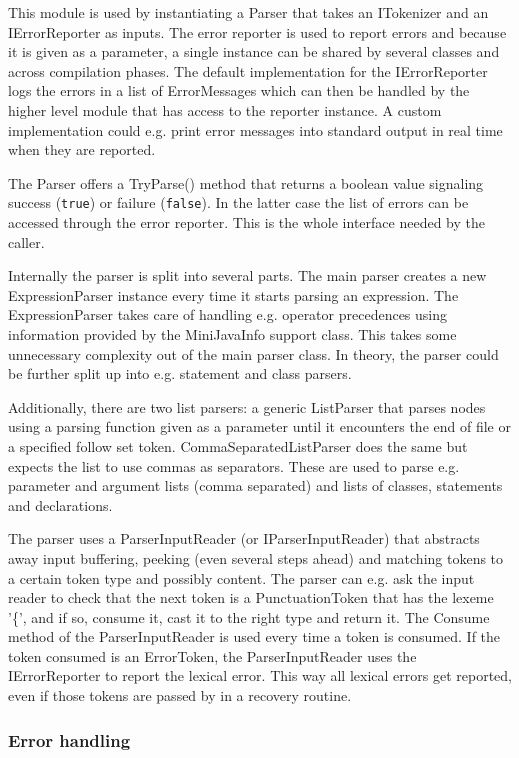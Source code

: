 \documentclass[a4paper,11pt]{article}
\begin{document}
This module is used by instantiating a Parser that takes an ITokenizer and an IErrorReporter as inputs. The error reporter is used to report errors and because it is given as a parameter, a single instance can be shared by several classes and across compilation phases. The default implementation for the IErrorReporter logs the errors in a list of ErrorMessages which can then be handled by the higher level module that has access to the reporter instance. A custom implementation could e.g. print error messages into standard output in real time when they are reported.

The Parser offers a TryParse() method that returns a boolean value signaling success (\verb,true,) or failure (\verb,false,). In the latter case the list of errors can be accessed through the error reporter. This is the whole interface needed by the caller.

Internally the parser is split into several parts. The main parser creates a new ExpressionParser instance every time it starts parsing an expression. The ExpressionParser takes care of handling e.g. operator precedences using information provided by the MiniJavaInfo support class. This takes some unnecessary complexity out of the main parser class. In theory, the parser could be further split up into e.g. statement and class parsers.

Additionally, there are two list parsers: a generic ListParser that parses nodes using a parsing function given as a parameter until it encounters the end of file or a specified follow set token. CommaSeparatedListParser does the same but expects the list to use commas as separators. These are used to parse e.g. parameter and argument lists (comma separated) and lists of classes, statements and declarations.

The parser uses a ParserInputReader (or IParserInputReader) that abstracts away input buffering, peeking (even several steps ahead) and matching tokens to a certain token type and possibly content. The parser can e.g. ask the input reader to check that the next token is a PunctuationToken that has the lexeme '\{', and if so, consume it, cast it to the right type and return it. The Consume method of the ParserInputReader is used every time a token is consumed. If the token consumed is an ErrorToken, the ParserInputReader uses the IErrorReporter to report the lexical error. This way all lexical errors get reported, even if those tokens are passed by in a recovery routine.

\subsubsection{Error handling}
\end{document}
